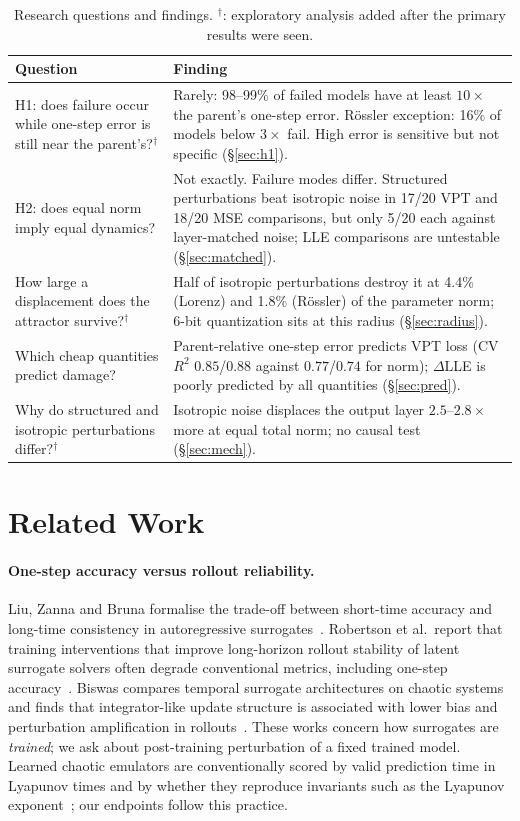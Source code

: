 \documentclass[11pt]{article}
\begin{document}
\begin{table}[t]
\centering\small
\caption{Research questions and findings. $^\dagger$: exploratory analysis added after the primary results were seen.}\label{tab:summary}
\begin{tabular}{@{}p{}p{}@{}}
\toprule
Question & Finding\\
\midrule
H1: does failure occur while one-step error is still near the parent's?$^\dagger$ & Rarely: 98--99\% of failed models have at least $10\times$ the parent's one-step error. R\"ossler exception: 16\% of models below $3\times$ fail. High error is sensitive but not specific (\S\ref{sec:h1}).\\[2pt]
H2: does equal norm imply equal dynamics? & Not exactly. Failure modes differ. Structured perturbations beat isotropic noise in 17/20 VPT and 18/20 MSE comparisons, but only 5/20 each against layer-matched noise; LLE comparisons are untestable (\S\ref{sec:matched}).\\[2pt]
How large a displacement does the attractor survive?$^\dagger$ & Half of isotropic perturbations destroy it at 4.4\% (Lorenz) and 1.8\% (R\"ossler) of the parameter norm; 6-bit quantization sits at this radius (\S\ref{sec:radius}).\\[2pt]
Which cheap quantities predict damage? & Parent-relative one-step error predicts VPT loss (CV $R^2$ $0.85$/$0.88$ against $0.77$/$0.74$ for norm); $\Delta$LLE is poorly predicted by all quantities (\S\ref{sec:pred}).\\[2pt]
Why do structured and isotropic perturbations differ?$^\dagger$ & Isotropic noise displaces the output layer $2.5$--$2.8\times$ more at equal total norm; no causal test (\S\ref{sec:mech}).\\
\bottomrule
\end{tabular}
\end{table}

\section{Related Work}
\paragraph{One-step accuracy versus rollout reliability.} Liu, Zanna and Bruna formalise the trade-off between short-time accuracy and long-time consistency in autoregressive surrogates~\cite{liu2026sns}. Robertson et al.\ report that training interventions that improve long-horizon rollout stability of latent surrogate solvers often degrade conventional metrics, including one-step accuracy~\cite{robertson2026}. Biswas compares temporal surrogate architectures on chaotic systems and finds that integrator-like update structure is associated with lower bias and perturbation amplification in rollouts~\cite{biswas2026}. These works concern how surrogates are \emph{trained}; we ask about post-training perturbation of a fixed trained model. Learned chaotic emulators are conventionally scored by valid prediction time in Lyapunov times and by whether they reproduce invariants such as the Lyapunov exponent~\cite{pathak2017,pathak2018,gilpin2023}; our endpoints follow this practice.
\end{document}
